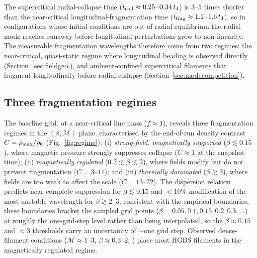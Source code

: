 \documentclass[usenatbib,twoside,twocolumn]{mnras}
\begin{document}
The supercritical radial-collapse time ($t_{\rm coll}\approx0.25$--$0.34\,t_{\rm J}$) is $3$--$5$ times shorter than the near-critical longitudinal-fragmentation time ($t_{\rm frag}\approx1.1$--$1.6\,t_{\rm J}$), so in configurations whose initial conditions are out of radial equilibrium the radial mode reaches runaway before longitudinal perturbations grow to non-linearity. The measurable fragmentation wavelengths therefore come from two regimes: the near-critical, quasi-static regime where longitudinal beading is observed directly (Section~\ref{sec:fieldgeo}), and ambient-confined supercritical filaments that fragment longitudinally before radial collapse (Section~\ref{sec:modecompetition}).

\subsection{Three fragmentation regimes}

The baseline grid, at a near-critical line mass ($f\approx1$), reveals three fragmentation regimes in the $(\beta,\mathcal{M})$ plane, characterised by the end-of-run density contrast $C=\rho_{\rm max}/\rho_0$ (Fig.~\ref{fig:regime}): (i) \emph{strong-field, magnetically supported} ($\beta\lesssim0.15$), where magnetic pressure strongly suppresses collapse ($C\approx1$ at the snapshot time); (ii) \emph{magnetically regulated} ($0.2\lesssim\beta\lesssim2$), where fields modify but do not prevent fragmentation ($C=3$--$11$); and (iii) \emph{thermally dominated} ($\beta\gtrsim3$), where fields are too weak to affect the scale ($C=13$--$22$). The dispersion relation \citep{Nakamura1993} predicts near-complete suppression for $\beta\lesssim0.15$ and $<10\%$ modification of the most unstable wavelength for $\beta\gtrsim2$--$3$, consistent with the empirical boundaries; these boundaries bracket the sampled grid points ($\beta=0.05,0.1,0.15,0.2,0.3,\ldots$) at roughly the one-grid-step level rather than being interpolated, so the $\beta\approx0.15$ and $\approx3$ thresholds carry an uncertainty of $\sim$one grid step. Observed dense-filament conditions ($\mathcal{M}\approx1$--$3$, $\beta\approx0.3$--$2$; \citealt{Arzoumanian2019,Planck2016,Pattle2018}) place most HGBS filaments in the magnetically regulated regime.
\end{document}
